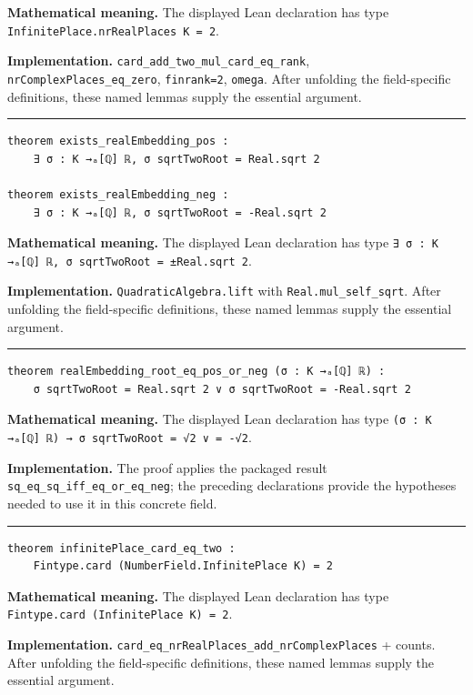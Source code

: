 \documentclass[UTF8,a4paper,11pt,fontset=fandol]{ctexart}
\theoremstyle{definition}
\newcommand{\statementsep}{\par\medskip\hrule\medskip}
\begin{document}
\noindent\textbf{Mathematical meaning.} The displayed Lean declaration has type \texttt{InfinitePlace.\allowbreak{}nrRealPlaces K = 2}.\par
\noindent\textbf{Implementation.} \texttt{card\_\allowbreak{}add\_\allowbreak{}two\_\allowbreak{}mul\_\allowbreak{}card\_\allowbreak{}eq\_\allowbreak{}rank}, \texttt{nrComplexPlaces\_\allowbreak{}eq\_\allowbreak{}zero}, \texttt{finrank=2}, \texttt{omega}. After unfolding the field-specific definitions, these named lemmas supply the essential argument.\par
\statementsep
\begin{verbatim}
theorem exists_realEmbedding_pos :
    ∃ σ : K →ₐ[ℚ] ℝ, σ sqrtTwoRoot = Real.sqrt 2

theorem exists_realEmbedding_neg :
    ∃ σ : K →ₐ[ℚ] ℝ, σ sqrtTwoRoot = -Real.sqrt 2
\end{verbatim}
\noindent\textbf{Mathematical meaning.} The displayed Lean declaration has type \texttt{∃ σ : K →ₐ[ℚ] ℝ, σ sqrtTwoRoot = ±Real.\allowbreak{}sqrt 2}.\par
\noindent\textbf{Implementation.} \texttt{QuadraticAlgebra.\allowbreak{}lift} with \texttt{Real.\allowbreak{}mul\_\allowbreak{}self\_\allowbreak{}sqrt}. After unfolding the field-specific definitions, these named lemmas supply the essential argument.\par
\statementsep
\begin{verbatim}
theorem realEmbedding_root_eq_pos_or_neg (σ : K →ₐ[ℚ] ℝ) :
    σ sqrtTwoRoot = Real.sqrt 2 ∨ σ sqrtTwoRoot = -Real.sqrt 2
\end{verbatim}
\noindent\textbf{Mathematical meaning.} The displayed Lean declaration has type \texttt{(σ : K →ₐ[ℚ] ℝ) → σ sqrtTwoRoot = √2 ∨ = -√2}.\par
\noindent\textbf{Implementation.} The proof applies the packaged result \texttt{sq\_\allowbreak{}eq\_\allowbreak{}sq\_\allowbreak{}iff\_\allowbreak{}eq\_\allowbreak{}or\_\allowbreak{}eq\_\allowbreak{}neg}; the preceding declarations provide the hypotheses needed to use it in this concrete field.\par
\statementsep
\begin{verbatim}
theorem infinitePlace_card_eq_two :
    Fintype.card (NumberField.InfinitePlace K) = 2
\end{verbatim}
\noindent\textbf{Mathematical meaning.} The displayed Lean declaration has type \texttt{Fintype.\allowbreak{}card (InfinitePlace K) = 2}.\par
\noindent\textbf{Implementation.} \texttt{card\_\allowbreak{}eq\_\allowbreak{}nrRealPlaces\_\allowbreak{}add\_\allowbreak{}nrComplexPlaces} + counts. After unfolding the field-specific definitions, these named lemmas supply the essential argument.\par
\end{document}
